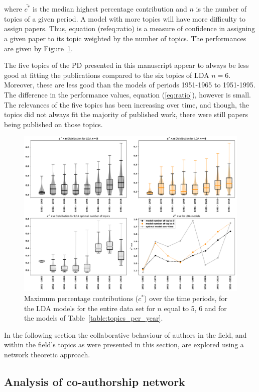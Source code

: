 \documentclass{article}
\theoremstyle{definition}
\begin{document}
where \(\bar{c^*}\) is the median highest percentage contribution and \(n\)
is the number of topics of a given period. A model with more topics will have more
difficulty to assign papers. Thus, equation (ref{eq:ratio}) is a measure of confidence
in assigning a given paper to its topic weighted by the number of topics.
The performances are
given by Figure~\ref{fig:median_percentage_contribution_over_time}.

The five topics of the PD presented in this manuscript appear to always be
less good at fitting the publications compared to the six topics of LDA \(n=6\).
Moreover, these are less good than the models of periods 1951-1965 to 1951-1995.
The difference in the performance values, equation (\ref{eq:ratio}),
however is small. The relevances of the five topics has been increasing
over time, and though, the topics did not always fit the majority of published
work, there were still papers being published on those topics.

\begin{figure}[!hbtp]
    \centering
    \includegraphics[width=.75\textwidth]{./assets/images/contribution_over_time.pdf}
    \caption{Maximum percentage contributions (\(c^*\)) over the time periods,
    for the LDA models for the entire data set for \(n\) equal to 5, 6
    and for the models of Table~\ref{table:topics_per_year}.}
    \label{fig:median_percentage_contribution_over_time}
\end{figure}

In the following section the collaborative behaviour of authors in the field,
and within the field's topics as were presented in this section, are explored
using a network theoretic approach.

\subsection{Analysis of co-authorship network}\label{subsection:co_authorship}
\end{document}
